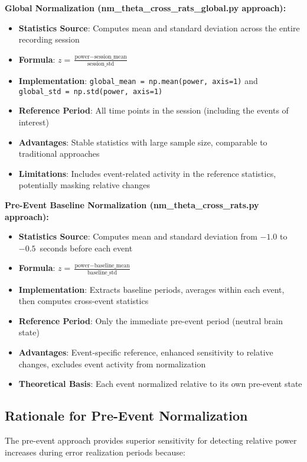 \documentclass[11pt]{article}
\begin{document}
\textbf{Global Normalization (nm\_theta\_cross\_rats\_global.py approach):}
\begin{itemize}
\item \textbf{Statistics Source}: Computes mean and standard deviation across the entire recording session
\item \textbf{Formula}: $z = \frac{\text{power} - \text{session\_mean}}{\text{session\_std}}$
\item \textbf{Implementation}: \texttt{global\_mean = np.mean(power, axis=1)} and \texttt{global\_std = np.std(power, axis=1)}
\item \textbf{Reference Period}: All time points in the session (including the events of interest)
\item \textbf{Advantages}: Stable statistics with large sample size, comparable to traditional approaches
\item \textbf{Limitations}: Includes event-related activity in the reference statistics, potentially masking relative changes
\end{itemize}

\textbf{Pre-Event Baseline Normalization (nm\_theta\_cross\_rats.py approach):}
\begin{itemize}
\item \textbf{Statistics Source}: Computes mean and standard deviation from $-1.0$ to $-0.5$~seconds before each event
\item \textbf{Formula}: $z = \frac{\text{power} - \text{baseline\_mean}}{\text{baseline\_std}}$
\item \textbf{Implementation}: Extracts baseline periods, averages within each event, then computes cross-event statistics
\item \textbf{Reference Period}: Only the immediate pre-event period (neutral brain state)
\item \textbf{Advantages}: Event-specific reference, enhanced sensitivity to relative changes, excludes event activity from normalization
\item \textbf{Theoretical Basis}: Each event normalized relative to its own pre-event state
\end{itemize}

\subsection{Rationale for Pre-Event Normalization}

The pre-event approach provides superior sensitivity for detecting relative power increases during error realization periods because:
\end{document}
